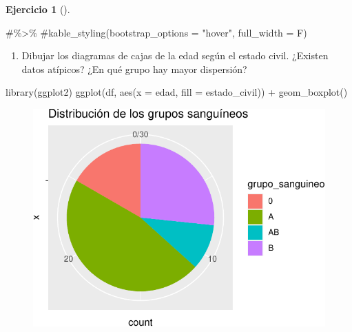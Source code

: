 \documentclass[
  a4paper,
]{scrreport}
\newenvironment{Shaded}{\begin{snugshade}}{\end{snugshade}}
\newcommand{\AttributeTok}[1]{\textcolor[rgb]{0.40,0.45,0.13}{#1}}
\newcommand{\CommentTok}[1]{\textcolor[rgb]{0.37,0.37,0.37}{#1}}
\newcommand{\FunctionTok}[1]{\textcolor[rgb]{0.28,0.35,0.67}{#1}}
\newcommand{\NormalTok}[1]{\textcolor[rgb]{0.00,0.23,0.31}{#1}}
\newcommand{\SpecialCharTok}[1]{\textcolor[rgb]{0.37,0.37,0.37}{#1}}
\providecommand{\tightlist}{%
  \setlength{\itemsep}{0pt}\setlength{\parskip}{0pt}}\usepackage{longtable,booktabs,array}
\theoremstyle{definition}
\newtheorem{exercise}{Ejercicio}[chapter]
\theoremstyle{remark}
\begin{document}
\begin{exercise}[]
\begin{tcolorbox}
\begin{Shaded}
\begin{Highlighting}[]
    \CommentTok{\#\%\textgreater{}\%}
    \CommentTok{\#kable\_styling(bootstrap\_options = "hover", full\_width = F)}
\end{Highlighting}
\end{Shaded}

\end{tcolorbox}

\begin{enumerate}
\def\labelenumi{\alph{enumi}.}
\setcounter{enumi}{2}
\tightlist
\item
  Dibujar los diagramas de cajas de la edad según el estado civil.
  ¿Existen datos atípicos? ¿En qué grupo hay mayor dispersión?
\end{enumerate}

\begin{tcolorbox}[enhanced jigsaw, rightrule=.15mm, toptitle=1mm, colbacktitle=quarto-callout-tip-color!10!white, titlerule=0mm, colback=white, leftrule=.75mm, bottomtitle=1mm, colframe=quarto-callout-tip-color-frame, breakable, title=\textcolor{quarto-callout-tip-color}{\faLightbulb}\hspace{0.5em}{Solución}, arc=.35mm, coltitle=black, opacityback=0, bottomrule=.15mm, opacitybacktitle=0.6, left=2mm, toprule=.15mm]

\begin{Shaded}
\begin{Highlighting}[]
\FunctionTok{library}\NormalTok{(ggplot2)}
\FunctionTok{ggplot}\NormalTok{(df, }\FunctionTok{aes}\NormalTok{(}\AttributeTok{x =}\NormalTok{ edad, }\AttributeTok{fill =}\NormalTok{ estado\_civil)) }\SpecialCharTok{+}
    \FunctionTok{geom\_boxplot}\NormalTok{()}
\end{Highlighting}
\end{Shaded}

\begin{figure}[H]

{\centering \includegraphics{./03-frecuencias-graficos_files/figure-pdf/unnamed-chunk-27-1.pdf}

}
\end{figure}
\end{tcolorbox}
\end{exercise}
\end{document}
